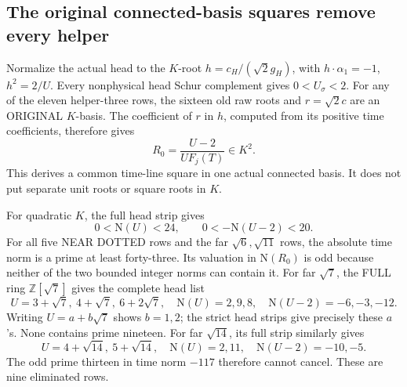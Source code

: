 \documentclass[11pt]{article}
\begin{document}
\subsection{The original connected-basis squares remove every helper}
\label{app:arithB16helpersquares}

Normalize the actual head to the \(K\)-root
\(h=c_H/(\sqrt2g_H)\), with
\(h\cdot\alpha_1=-1\), \(h^2=2/U\).
Every nonphysical head Schur complement gives
\(0<U_\sigma<2\).
For any of the eleven helper-three rows, the
sixteen old raw roots and \(r=\sqrt2c\) are an
ORIGINAL \(K\)-basis.
The coefficient of \(r\) in \(h\), computed from
its positive time coefficients, therefore gives
\[
                      R_0={\frac{U-2}{U F_j(T)}}\in K^2 .
\]
This derives a common time-line square in one
actual connected basis.  It does not put separate
unit roots or square roots in \(K\).

For quadratic \(K\), the full head strip gives
\[
                     0<\mathrm N(U)<24,\qquad
                     0<-\mathrm N(U-2)<20.
\]
For all five NEAR DOTTED rows and the far
\(\sqrt6,\sqrt{11}\) rows, the absolute time
norm is a prime at least forty-three.
Its valuation in \(\mathrm N(R_0)\) is odd
because neither of the two bounded integer norms
can contain it.
For far \(\sqrt7\), the FULL ring
\(\mathbb Z[\sqrt7]\) gives the complete head list
\[
 U=3+\sqrt7,\ 4+\sqrt7,\ 6+2\sqrt7,
\quad \mathrm N(U)=2,9,8,\quad
 \mathrm N(U-2)=-6,-3,-12 .
\]
Writing \(U=a+b\sqrt7\) shows \(b=1,2\);
the strict head strips give precisely these \(a\)'s.
None contains prime nineteen.
For far \(\sqrt{14}\), its full strip similarly
gives
\[
 U=4+\sqrt{14},\ 5+\sqrt{14},\quad
 \mathrm N(U)=2,11,\quad\mathrm N(U-2)=-10,-5 .
\]
The odd prime thirteen in time norm \(-117\)
therefore cannot cancel.
These are nine eliminated rows.
\end{document}
